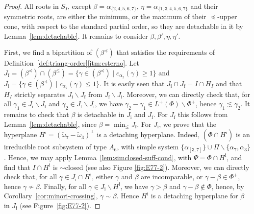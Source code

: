 \documentclass[ALCO,published]{cedram}
\theoremstyle{plain}
\newcommand\smeno{\smallsetminus}
\newcommand\al{\alpha}
\newcommand\be{\beta}
\newcommand\ga{\gamma}
\newcommand\preq{\preccurlyeq}
\renewcommand{\leq}{\leqslant}
\begin{document}
\begin{proof}
\par
All roots in $S_I$, except $\be=\al_{\{2, 4, 5, 6,7\}}$, $\eta=\al_{\{1, 3, 4, 5, 6,7\}}$ and their symmetric roots, are either the minimum, or the maximum of their $\preq$-upper cone, with respect to the standard partial order, so they are detachable in it by Lemma~\ref{lem:detachable}. 
It remains to consider $\be, \be', \eta, \eta'$.

\par
First, we find a bipartition of  $(\be^\preq)$ that satisfies the requirements of Definition~\ref{def:triang-order}\ref{itm:esterno}. 
Let $J_{\mathrm f}=(\be^\preq)\cap (\be^\leq) =\{\ga\in (\be^\preq)\mid c_{\al_2}(\ga)\geq 1\}$ and $J_{\mathrm i}=\{\ga\in (\be^\preq)\mid c_{\al_2}(\ga)\leq 1\}$. 
It is easily seen that $J_{\mathrm i}\cap J_{\mathrm f}=I\cap H_I$ and that $H_I$ strictly separates $J_{\mathrm i}\smeno J_{\mathrm f}$ from $J_{\mathrm f}\smeno J_{\mathrm i}$. 
Moreover, we can directly check that,  for all $\ga_1\in J_{\mathrm i}\smeno J_{\mathrm f}$ and $\ga_2\in J_{\mathrm f}\smeno J_{\mathrm i}$, we have $\ga_2-\ga_1 \in 
L^+(\Phi)\smeno \Phi^+$, hence $\ga_1\lesssim \ga_2$. 
It remains to check that $\be$ is detachable in  $J_{\mathrm i}$ and $J_{\mathrm f}$.
For $J_{\mathrm f}$ this follows from Lemma~\ref{lem:detachable}, since $\be=\min_\leq J_{\mathrm f}$. 
For $J_{\mathrm i}$, we prove that the hyperplane  $H^{\mathrm i}=(\check\omega_7-\check\omega_3)^\perp$ is a detaching hyperplane. 
Indeed, $(\Phi\cap H^{\mathrm i})$ is an irreducible root subsystem of type $A_6$, with simple system $\{\al_{[3,7]}\}\cup \Pi\smeno\{\al_7, \al_3\}$. 
Hence, we may apply  Lemma~\ref{lem:simclosed-suff-cond}, with $\Psi=\Phi\cap H^{\mathrm i}$, and find that $I\cap H^{\mathrm i}$ is $\sim$closed (see also Figure \ref{fig:E77-2}). 
Moreover, we can directly check that, for all $\ga\in J_{\mathrm i} \cap H^{\mathrm i}$, either $\ga$ and $\be$ are incomparable, or $\ga - \be\in \Phi^+$, hence $\ga\not\sim \be$. 
Finally, for all $\ga\in J_{\mathrm i} \smeno H^{\mathrm i}$, we have $\ga> \be$ and $\ga-\be\not\in \Phi$, hence, by Corollary~\ref{cor:minori-crossing}, $\ga\sim \be$.
Hence $H^{\mathrm i}$ is a detaching hyperplane for $\be$ in
$J_{\mathrm i}$ (see Figure~\ref{fig:E77-2}).



\end{proof}
\end{document}
